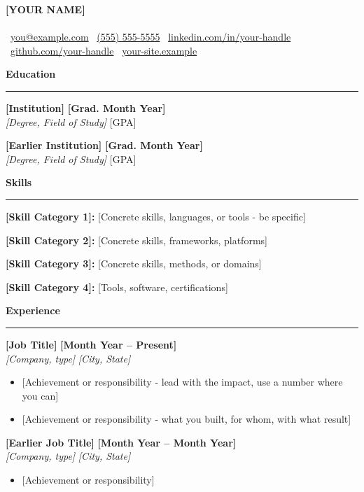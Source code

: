 \documentclass[10pt, letterpaper]{article}
\newcommand{\resumesection}[1]{
    \vspace{6pt}
    {\large\textbf{#1}}\\
    \vspace{3pt}
    \hrule
    \vspace{6pt}
}
\newcommand{\resumeentry}[4]{
    \par\textbf{#1} \hfill #2 \\
    \vspace{1pt}
    #3 \hfill #4\par
}
\begin{document}
\begin{center}
{\Huge\textbf{[YOUR NAME]}}\\ \vspace{4pt}{\large [City, State ZIP]} \\
\vspace{4pt}
\faEnvelope\ \href{mailto:you@example.com}{you@example.com} \hspace{.4cm}
\faPhone\ \href{tel:+15555555555}{(555) 555-5555} \hspace{.4cm}
\faLinkedin\ \href{https://www.linkedin.com/in/your-handle}{linkedin.com/in/your-handle} \hspace{.4cm}
\faGithub\ \href{https://github.com/your-handle}{github.com/your-handle} \hspace{.4cm}
\faGlobe\ \href{https://your-site.example}{your-site.example}
\end{center}

\resumesection{Education}

\resumeentry{[Institution]}{\textbf{[Grad. Month Year]}}
{\textit{[Degree, Field of Study]}}{[GPA]}
\vspace{3pt}
\resumeentry{[Earlier Institution]}{\textbf{[Grad. Month Year]}}
{\textit{[Degree, Field of Study]}}{[GPA]}

\resumesection{Skills}

\textbf{[Skill Category 1]:} [Concrete skills, languages, or tools - be specific]

\vspace{2pt}
\textbf{[Skill Category 2]:} [Concrete skills, frameworks, platforms]

\vspace{2pt}
\textbf{[Skill Category 3]:} [Concrete skills, methods, or domains]

\vspace{2pt}
\textbf{[Skill Category 4]:} [Tools, software, certifications]

\resumesection{Experience}

\resumeentry{[Job Title]}{\textbf{[Month Year -- Present]}}
{\textit{[Company, type]}}{\textit{[City, State]}}
\begin{itemize}[leftmargin=15pt, topsep=2pt, itemsep=1pt, parsep=0pt]
\item {[Achievement or responsibility - lead with the impact, use a number where you can]}
\item {[Achievement or responsibility - what you built, for whom, with what result]}
\end{itemize}
\vspace{3pt}
\resumeentry{[Earlier Job Title]}{\textbf{[Month Year -- Month Year]}}
{\textit{[Company, type]}}{\textit{[City, State]}}
\begin{itemize}[leftmargin=15pt, topsep=2pt, itemsep=1pt, parsep=0pt]
\item {[Achievement or responsibility]}
\end{itemize}
\end{document}

